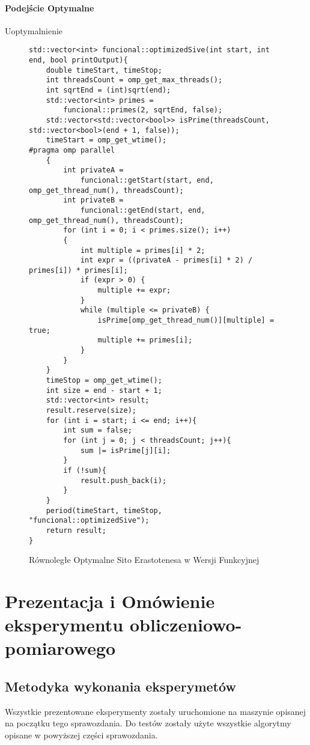 \documentclass{article}
\begin{document}
                    \paragraph{Podejście Optymalne}
                        Uoptymalnienie 
                        \begin{figure}[H]
                            \begin{verbatim}
std::vector<int> funcional::optimizedSive(int start, int end, bool printOutput){
    double timeStart, timeStop;
    int threadsCount = omp_get_max_threads();
    int sqrtEnd = (int)sqrt(end);
    std::vector<int> primes = 
        funcional::primes(2, sqrtEnd, false);
    std::vector<std::vector<bool>> isPrime(threadsCount, std::vector<bool>(end + 1, false));
    timeStart = omp_get_wtime();
#pragma omp parallel
    {
        int privateA = 
            funcional::getStart(start, end, omp_get_thread_num(), threadsCount);
        int privateB = 
            funcional::getEnd(start, end, omp_get_thread_num(), threadsCount);
        for (int i = 0; i < primes.size(); i++)
        {
            int multiple = primes[i] * 2;
            int expr = ((privateA - primes[i] * 2) / primes[i]) * primes[i];
            if (expr > 0) {
                multiple += expr;
            }
            while (multiple <= privateB) {
                isPrime[omp_get_thread_num()][multiple] = true;
                multiple += primes[i];
            }
        }
    }
    timeStop = omp_get_wtime();
    int size = end - start + 1;
    std::vector<int> result;
    result.reserve(size);
    for (int i = start; i <= end; i++){
        int sum = false;
        for (int j = 0; j < threadsCount; j++){
            sum |= isPrime[j][i];
        }
        if (!sum){
            result.push_back(i);
        }
    }
    period(timeStart, timeStop, "funcional::optimizedSive");
    return result;
}
                            \end{verbatim}
                            \caption{Równoległe Optymalne Sito Erastotenesa w Wersji Funkcyjnej}
                        \end{figure}
    \section{Prezentacja i Omówienie eksperymentu obliczeniowo-pomiarowego}
        \subsection{Metodyka wykonania eksperymetów}
                Wszystkie prezentowane eksperymenty zostały uruchomione na maszynie opisanej na początku tego sprawozdania. Do testów zostały użyte wszystkie algorytmy opisane w powyższej części sprawozdania.
                
\end{document}
